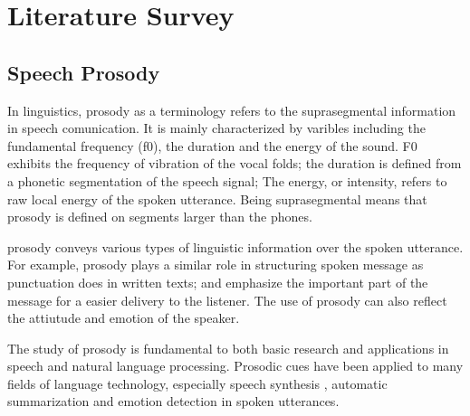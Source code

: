 \chapter{Literature Survey}

\section{Speech Prosody}
In linguistics, prosody as a terminology refers to the suprasegmental information in speech comunication. It is mainly characterized by varibles including the fundamental frequency (f0), the duration and the energy of the sound. F0 exhibits the frequency of vibration of the vocal folds; the duration is defined from a phonetic segmentation of the speech signal; The energy, or intensity, refers to raw local energy of the spoken utterance. Being suprasegmental means that prosody is defined on segments larger than the phones.

prosody conveys various types of linguistic information over the spoken utterance. For example, prosody plays a similar role in structuring spoken message as punctuation does in written texts; and emphasize the important part of the message for a easier delivery to the listener. The use of prosody can also reflect the attiutude and emotion of the speaker. \citep{Jurafsky2008, Hirschberg2017, Jouvet2019}

The study of prosody is fundamental to both basic research and applications in speech and natural language processing. Prosodic cues have been applied to many fields of language technology, especially speech synthesis  \citep{Schuller2018}, automatic summarization \citep{Chen2010} and emotion detection \citep{Liu2016} in spoken utterances. 

